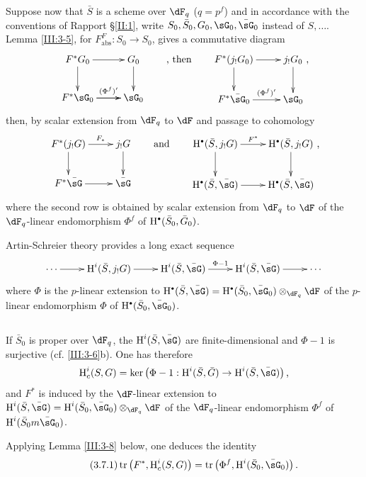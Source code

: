 Suppose now that $\bar S$ is a scheme over $\dF_q$ ($q=p^f$) and
in accordance with the conventions of Rapport \S\ref{II:1}, write
$S_0,\bar S_0,G_0,\sG_0,\bar\sG_0$ instead of $S,\dots$. Lemma
\ref{III:3-5}, for $F_\text{abs}^F:S_0\to S_0$, gives a commutative diagram
\[\xymatrix{
  F^* G_0 \ar[r] \ar[d]
    & G_0 \ar[d] \\
  F^*\sG_0 \ar[r]^-{(\Phi^f)'} \ar[r]
    & \sG_0
}\qquad\text{, then}\qquad
\xymatrix{
  F^*(j_! G_0) \ar[r] \ar[d]
    & j_!G_0 \ar[d] \\
  F^*\bar\sG_0 \ar[r]^-{(\Phi^f)'}
    & \sG_0
}\text{,}
\]
then, by scalar extension from $\dF_q$ to $\dF$ and passage to
cohomology
\[\xymatrix{
  F^*(j_! G) \ar[r]^-{F_*} \ar[d]
    & j_!G \ar[d] \\
  F^*\bar\sG \ar[r]
    & \bar\sG
}\qquad\text{and}\qquad
\xymatrix{
  \h^\bullet(\bar S,j_! G) \ar[r]^-{F^*} \ar[d]
    & \h^\bullet(\bar S,j_!G) \ar[d] \\
  \h^\bullet(\bar S,\bar\sG) \ar[r]
    & \h^\bullet(\bar S,\bar\sG)
}\text{,}
\]
where the second row is obtained by scalar extension from $\dF_q$ to
$\dF$ of the $\dF_q$-linear endomorphism $\Phi^f$ of
$\h^\bullet(\bar S_0,\bar G_0)$.

Artin-Schreier theory provides a long exact sequence
\[\xymatrix{
  \cdots \ar[r]
    & \h^i(\bar S,j_! G) \ar[r]
    & \h^i(\bar S,\bar\sG) \ar[r]^-{\Phi-1}
    & \h^i(\bar S,\bar\sG) \ar[r]
    & \cdots
}\]
where $\Phi$ is the $p$-linear extension to
$\h^\bullet(\bar S,\bar \sG)= \h^\bullet(\bar S_0,\bar\sG_0)\otimes_{\dF_q}\dF$
of the $p$-linear endomorphism $\Phi$ of $\h^\bullet(\bar S_0,\bar\sG_0)$.




\subsection{}\label{III:3-7}

If $\bar S_0$ is proper over $\dF_q$, the $\h^i(\bar S,\bar\sG)$ are
finite-dimensional and $\Phi-1$ is surjective (cf. \ref{III:3-6}b). One has therefore
\[
  \h_c^i(S,G) = \ker\left(\Phi-1 : \h^i(\bar S,\bar G) \to \h^i(\bar S,\bar\sG)\right) \text{,}
\]
and $F^*$ is induced by the $\dF$-linear extension to
$\h^i(\bar S,\bar\sG) = \h^i(\bar S_0,\bar\sG_0)\otimes_{\dF_q}\dF$ of
the $\dF_q$-linear endomorphism $\Phi^f$ of $\h^i(\bar S_0m\bar\sG_0)$.

Applying Lemma \ref{III:3-8} below, one deduces the identity
\begin{equation*}\tag{3.7.1}\label{III:eq:3-7-1}
  \tr\left(F^*,\h_c^i(S,G)\right) = \tr\left(\Phi^f,\h^i(\bar S_0,\bar\sG_0)\right) \text{.}
\end{equation*}




